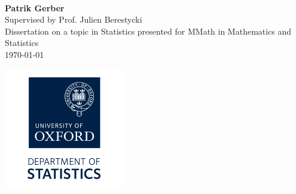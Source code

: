 \documentclass{article}
\begin{document}
\begin{titlepage}
   \begin{center}
       \vspace*{1cm}
 
       \textbf{{\color{blue}{\huge Branching Random Walks with Selection}}}
       \vspace{1.5cm} \\
       \textbf{Patrik Gerber}
       \vspace{0.5cm} \\
       Supervised by Prof. Julien Berestycki 
       \vspace{0.5cm} \\
       Dissertation on a topic in Statistics \linebreak presented for MMath in Mathematics and Statistics
       \vspace{0.3cm} \\
       \today
       \vfill
 
       \includegraphics[width=0.4\textwidth]{graphics/oxford_logo.png}
 
 
   \end{center}
\end{titlepage}

\tableofcontents
\newpage

% 
% 


% 






% 



\end{document}
